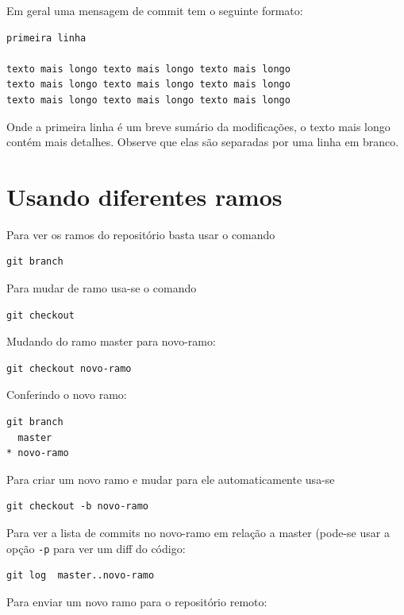 \documentclass[12pt,brazil]{book}
\begin{document}
Em geral uma mensagem de commit tem o seguinte formato:

\begin{verbatim}
primeira linha

texto mais longo texto mais longo texto mais longo
texto mais longo texto mais longo texto mais longo
texto mais longo texto mais longo texto mais longo 
\end{verbatim}

Onde a primeira linha é um breve sumário da modificações, o texto mais
longo contém mais detalhes. Observe que elas são separadas por uma
linha em branco.

\section{Usando diferentes ramos}
\label{sec:usando-o-git}

Para ver os ramos do repositório basta usar o comando

\begin{verbatim}
git branch
\end{verbatim}

Para mudar de ramo usa-se o comando

\begin{verbatim}
git checkout
\end{verbatim}

Mudando do ramo master para novo-ramo:

\begin{verbatim}
git checkout novo-ramo
\end{verbatim}

Conferindo o novo ramo:

\begin{verbatim}
git branch
  master
* novo-ramo
\end{verbatim}

Para criar um novo ramo e mudar para ele automaticamente usa-se

\begin{verbatim}
git checkout -b novo-ramo
\end{verbatim}

Para ver a lista de commits no novo-ramo em relação a master (pode-se
usar a opção \texttt{-p} para ver um diff do código:

\begin{verbatim}
git log  master..novo-ramo
\end{verbatim}

Para enviar um novo ramo para o repositório remoto:
\end{document}
